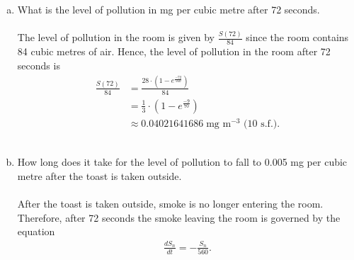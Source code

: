 \documentclass[reqno]{amsart}
\begin{document}
\begin{enumerate}[(a)]
\begin{align*}
			\end{align*}
			Integrating this simplified equation with respect to $t$ provides
			\begin{align*}
				e^{\frac{t}{560}} \cdot S &= 0.05 \int e^{\frac{t}{560}} dt	\\
										  &= 28 e^{\frac{t}{560}} + C \quad \text{where $C$ is a constant},
			\end{align*}
			and finally reduces to 
			\begin{align*}
				S(t) = 28 + Ce^{\frac{-t}{560}}.
			\end{align*}
			It is given that the air is initially clean, that is at $t = 0$, $S(0) = 0$. Substituting this into $S(t)$ gives
			\begin{align*}
				S(0) &= 28 + Ce^{\frac{0}{560}} = 0	\\
				C &= -28.
			\end{align*}
			Therefore, $S(t)$ for $0 \leq t \leq 72$ is given by
			\begin{align*}
				S(t) &= 28 - 28e^{\frac{-t}{560}}	\\
					 &= 28 \left(1 - e^{\frac{-t}{560}}\right).
			\end{align*}
			\\
		\item What is the level of pollution in mg per cubic metre after 72 seconds.
			\\ \\
			The level of pollution in the room is given by $\frac{S(72)}{84}$ since the room contains 84 cubic metres of air. Hence, the level of pollution in the room after 72 seconds is
			\begin{align*}
				\frac{S(72)}{84} &= \frac{28 \cdot \left(1 - e^{\frac{-72}{560}}\right)}{84}	\\
								 &= \frac{1}{3} \cdot \left(1 - e^{\frac{-9}{70}}\right)		\\
								 &\approx 0.04021641686 \; \text{mg m$^{-3}$ (10 s.f.)}.
			\end{align*}
			\\
		\item How long does it take for the level of pollution to fall to 0.005 mg per cubic metre after the toast is taken outside.
			\\ \\
			After the toast is taken outside, smoke is no longer entering the room. Therefore, after 72 seconds the smoke leaving the room is governed by the equation
			\begin{align*}
				\frac{dS_n}{dt} = -\frac{S_n}{560}.

\end{align*}
\end{enumerate}
\end{document}
